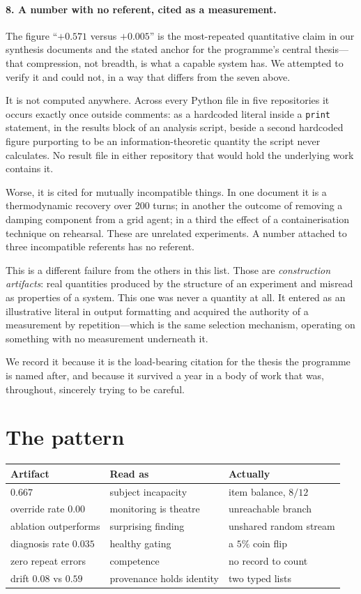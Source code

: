 \documentclass[11pt]{article}
\begin{document}
\paragraph{8. A number with no referent, cited as a measurement.} The figure
``$+0.571$ versus $+0.005$'' is the most-repeated quantitative claim in our
synthesis documents and the stated anchor for the programme's central
thesis---that compression, not breadth, is what a capable system has. We
attempted to verify it and could not, in a way that differs from the seven
above.

It is not computed anywhere. Across every Python file in five repositories it
occurs exactly once outside comments: as a hardcoded literal inside a
\texttt{print} statement, in the results block of an analysis script, beside a
second hardcoded figure purporting to be an information-theoretic quantity the
script never calculates. No result file in either repository that would hold
the underlying work contains it.

Worse, it is cited for mutually incompatible things. In one document it is a
thermodynamic recovery over 200 turns; in another the outcome of removing a
damping component from a grid agent; in a third the effect of a
containerisation technique on rehearsal. These are unrelated experiments. A
number attached to three incompatible referents has no referent.

This is a different failure from the others in this list. Those are
\emph{construction artifacts}: real quantities produced by the structure of an
experiment and misread as properties of a system. This one was never a quantity
at all. It entered as an illustrative literal in output formatting and acquired
the authority of a measurement by repetition---which is the same selection
mechanism, operating on something with no measurement underneath it.

We record it because it is the load-bearing citation for the thesis the
programme is named after, and because it survived a year in a body of work that
was, throughout, sincerely trying to be careful.

\section{The pattern}

\begin{table}[h]
\centering
\begin{tabular}{lll}
\toprule
Artifact & Read as & Actually \\
\midrule
$0.667$ & subject incapacity & item balance, $8/12$ \\
override rate $0.00$ & monitoring is theatre & unreachable branch \\
ablation outperforms & surprising finding & unshared random stream \\
diagnosis rate $0.035$ & healthy gating & a $5\%$ coin flip \\
zero repeat errors & competence & no record to count \\
drift $0.08$ vs $0.59$ & provenance holds identity & two typed lists \\
\bottomrule
\end{tabular}
\end{table}
\end{document}
